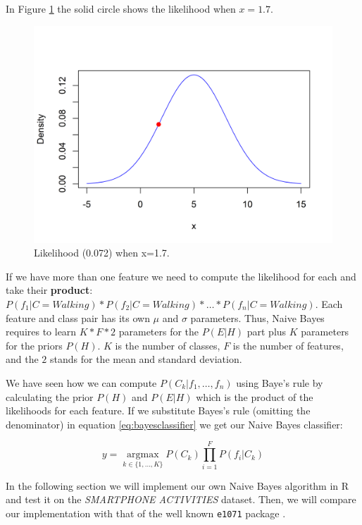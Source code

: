\documentclass[
  11pt,
]{krantz}
\begin{document}
In Figure \ref{fig:pdf2} the solid circle shows the likelihood when \(x=1.7\).

\begin{figure}

{\centering \includegraphics[width=0.9\linewidth]{images/pdf2} 

}

\caption{Likelihood (0.072) when x=1.7.}\label{fig:pdf2}
\end{figure}

If we have more than one feature we need to compute the likelihood for each and take their \textbf{product}: \(P(f_1|C=Walking)*P(f_2|C=Walking)*\dots*P(f_n|C=Walking)\). Each feature and class pair has its own \(\mu\) and \(\sigma\) parameters. Thus, Naive Bayes requires to learn \(K*F*2\) parameters for the \(P(E|H)\) part plus \(K\) parameters for the priors \(P(H)\). \(K\) is the number of classes, \(F\) is the number of features, and the \(2\) stands for the mean and standard deviation.

We have seen how we can compute \(P(C_k|f_1, \dots ,f_n)\) using Baye's rule by calculating the prior \(P(H)\) and \(P(E|H)\) which is the product of the likelihoods for each feature. If we substitute Bayes's rule (omitting the denominator) in equation \eqref{eq:bayesclassifier} we get our Naive Bayes classifier:

\begin{equation}
  y = \operatorname*{arg max}_{k \in \{1, \dots ,K\}} P(C_k) \prod_{i=1}^{F} P(f_i | C_k)
  \label{eq:bayesclassifier2}
\end{equation}

In the following section we will implement our own Naive Bayes algorithm in R and test it on the \emph{SMARTPHONE ACTIVITIES} dataset. Then, we will compare our implementation with that of the well known \texttt{e1071} package \citep{e1071}.
\end{document}
